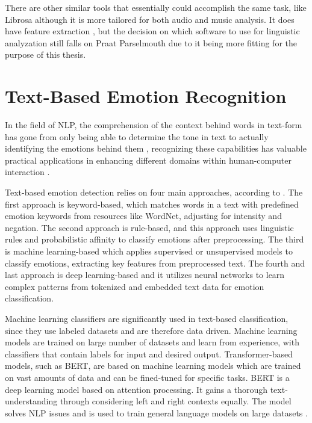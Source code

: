 There are other similar tools that essentially could accomplish the same task, like Librosa although it is more tailored for both audio and music analysis. It does have feature extraction \autocite{Babu2021}, but the decision on which software to use for linguistic analyzation still falls on Praat Parselmouth due to it being more fitting for the purpose of this thesis.

\section{Text-Based Emotion Recognition}

In the field of NLP, the comprehension of the context behind words in text-form has gone from only being able to determine the tone in text to actually identifying the emotions behind them \autocite{Esfahani2024}, recognizing these capabilities has valuable practical applications in enhancing different domains within human-computer interaction \autocite{Shelke2022}.

Text-based emotion detection relies on four main approaches, according to \textcite{Kusal2023}.
The first approach is keyword-based, which matches words in a text with predefined emotion keywords from resources like WordNet, adjusting for intensity and negation. The second approach is rule-based, and this approach uses linguistic rules and probabilistic affinity to classify emotions after preprocessing. The third is machine learning-based which applies supervised or unsupervised models to classify emotions, extracting key features from preprocessed text. The fourth and last approach is deep learning-based and it utilizes neural networks to learn complex patterns from tokenized and embedded text data for emotion classification.

Machine learning classifiers are significantly used in text-based classification, since they use labeled datasets and are therefore data driven. Machine learning models are trained on large number of datasets and learn from experience, with classifiers that contain labels for input and desired output. Transformer-based models, such as BERT, are based on machine learning models which are trained on vast amounts of data and can be fined-tuned for specific tasks. BERT is a deep learning model based on attention processing. It gains a thorough text-understanding through considering left and right contexts equally. The model solves NLP issues and is used to train general language models on large datasets \autocite{Kusal2024}.

